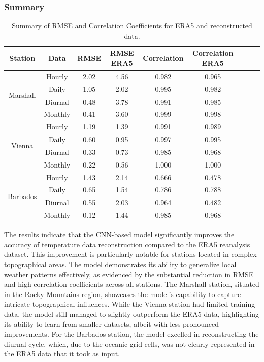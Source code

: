 \subsubsection*{Summary}

\begin{table}
\centering
\begin{tabular}{|c|c|c|c|c|c|c|c|c|}
\hline
Station & Data & RMSE & RMSE ERA5 & Correlation & Correlation ERA5 \\
\hline
\multirow{4}{*}{Marshall} & Hourly & 2.02 & 4.56 & 0.982 & 0.965 \\
& Daily & 1.05 & 2.02 & 0.995 & 0.982 \\
& Diurnal & 0.48 & 3.78 & 0.991 & 0.985 \\
& Monthly & 0.41 & 3.60 & 0.999 & 0.998 \\
\hline
\multirow{4}{*}{Vienna} & Hourly & 1.19 & 1.39 & 0.991 & 0.989 \\
& Daily & 0.60 & 0.95 & 0.997 & 0.995 \\
& Diurnal & 0.33 & 0.73 & 0.985 & 0.968 \\
& Monthly & 0.22 & 0.56 & 1.000 & 1.000 \\
\hline
\multirow{4}{*}{Barbados} & Hourly & 1.43 & 2.14 & 0.666 & 0.478 \\
& Daily & 0.65 & 1.54 & 0.786 & 0.788 \\
& Diurnal & 0.55 & 2.03 & 0.964 & 0.482 \\
& Monthly & 0.12 & 1.44 & 0.985 & 0.968 \\
\hline
\end{tabular}
\caption{Summary of RMSE and Correlation Coefficients for ERA5 and reconstructed data.}
\label{tab:results_summary}
\end{table}

The results indicate that the CNN-based model significantly improves the accuracy of temperature data reconstruction compared to the ERA5 reanalysis dataset. This improvement is particularly notable for stations located in complex topographical areas.
The model demonstrates its ability to generalize local weather patterns effectively, as evidenced by the substantial reduction in RMSE and high correlation coefficients across all stations. The Marshall station, situated in the Rocky Mountains region, showcases the model's capability to capture intricate topographical influences.
While the Vienna station had limited training data, the model still managed to slightly outperform the ERA5 data, highlighting its ability to learn from smaller datasets, albeit with less pronounced improvements.
For the Barbados station, the model excelled in reconstructing the diurnal cycle, which, due to the oceanic grid cells, was not clearly represented in the ERA5 data that it took as input.